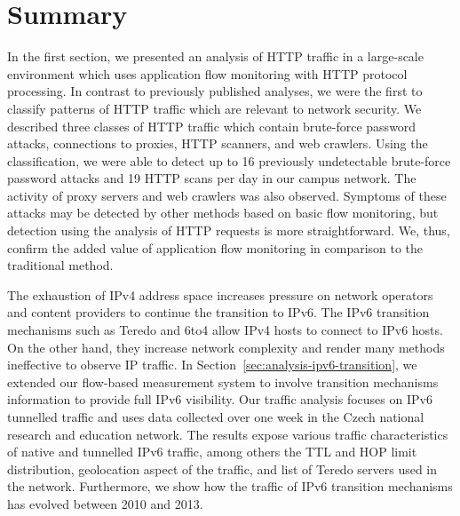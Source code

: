 \section{Summary}\label{sec:use-cases-summary}

In the first section, we presented an analysis of HTTP traffic in a large-scale environment which uses application flow monitoring with HTTP protocol processing. In contrast to previously published analyses, we were the first to classify patterns of HTTP traffic which are relevant to network security. We described three classes of HTTP traffic which contain brute-force password attacks, connections to proxies, HTTP scanners, and web crawlers. Using the classification, we were able to detect up to 16 previously undetectable brute-force password attacks and 19 HTTP scans per day in our campus network. The activity of proxy servers and web crawlers was also observed. Symptoms of these attacks may be detected by other methods based on basic flow monitoring, but detection using the analysis of HTTP requests is more straightforward. We, thus, confirm the added value of application flow monitoring in comparison to the traditional method.

The exhaustion of IPv4 address space increases pressure on network operators and content providers to continue the transition to IPv6. The IPv6 transition mechanisms such as Teredo and 6to4 allow IPv4 hosts to connect to IPv6 hosts. On the other hand, they increase network complexity and render many methods ineffective to observe IP traffic. In Section~\ref{sec:analysis-ipv6-transition}, we extended our flow-based measurement system to involve transition mechanisms information to provide full IPv6 visibility. Our traffic analysis focuses on IPv6 tunnelled traffic and uses data collected over one week in the Czech national research and education network. The results expose various traffic characteristics of native and tunnelled IPv6 traffic, among others the TTL and HOP limit distribution, geolocation aspect of the traffic, and list of Teredo servers used in the network. Furthermore, we show how the traffic of IPv6 transition mechanisms has evolved between 2010 and 2013.

